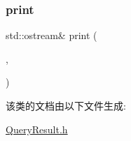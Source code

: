 \subsubsection{\texorpdfstring{print}{print}}
{\footnotesize\ttfamily std\+::ostream\& print (\begin{DoxyParamCaption}\item[{std\+::ostream \&}]{,  }\item[{const \hyperlink{classQueryResult}{Query\+Result} \&}]{ }\end{DoxyParamCaption})\hspace{0.3cm}{\ttfamily [friend]}}



该类的文档由以下文件生成\+:\begin{DoxyCompactItemize}
\item 
\hyperlink{QueryResult_8h}{Query\+Result.\+h}\end{DoxyCompactItemize}

